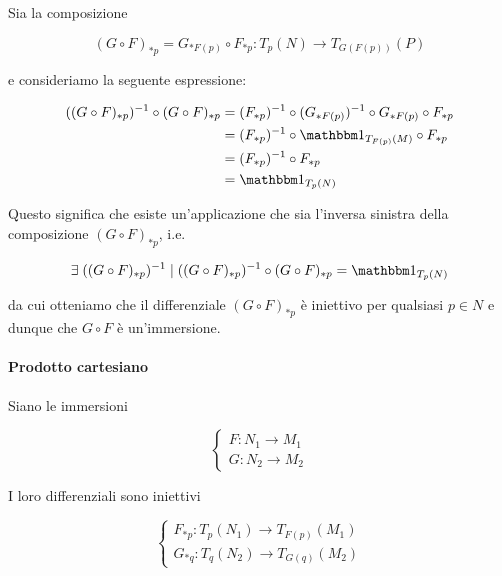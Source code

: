 {Sia la composizione

\begin{equation}
	(G \circ F)_{*p} = G_{*F(p)} \circ F_{*p} : T_{p}(N) \to T_{G(F(p))}(P)
\end{equation}

e consideriamo la seguente espressione:

\begin{align}
	\begin{split}
		((G \circ F)_{*p})^{-1} \circ (G \circ F)_{*p} &= (F_{*p})^{-1} \circ (G_{*F(p)})^{-1} \circ G_{*F(p)} \circ F_{*p} \\
		&= (F_{*p})^{-1} \circ \bigone_{T_{F(p)}(M)} \circ F_{*p} \\
		&= (F_{*p})^{-1} \circ F_{*p} \\
		&= \bigone_{T_{p}(N)}
	\end{split}
\end{align}

Questo significa che esiste un'applicazione che sia l'inversa sinistra della composizione $ (G \circ F)_{*p} $, i.e.

\begin{equation}
	\E ((G \circ F)_{*p})^{-1} \mid ((G \circ F)_{*p})^{-1} \circ (G \circ F)_{*p} = \bigone_{T_{p}(N)}
\end{equation}

da cui otteniamo che il differenziale $ (G \circ F)_{*p} $ è iniettivo per qualsiasi $ p \in N $ e dunque che $ G \circ F $ è un'immersione.

\paragraph{Prodotto cartesiano}

Siano le immersioni

\begin{equation}
	\begin{cases}
		F : N_{1} \to M_{1} \\
		G : N_{2} \to M_{2}
	\end{cases}
\end{equation}

I loro differenziali sono iniettivi

\begin{equation}
	\begin{cases}
		F_{*p} : T_{p}(N_{1}) \to T_{F(p)}(M_{1}) \\
		G_{*q} : T_{q}(N_{2}) \to T_{G(q)}(M_{2})
	\end{cases}
\end{equation}

}
